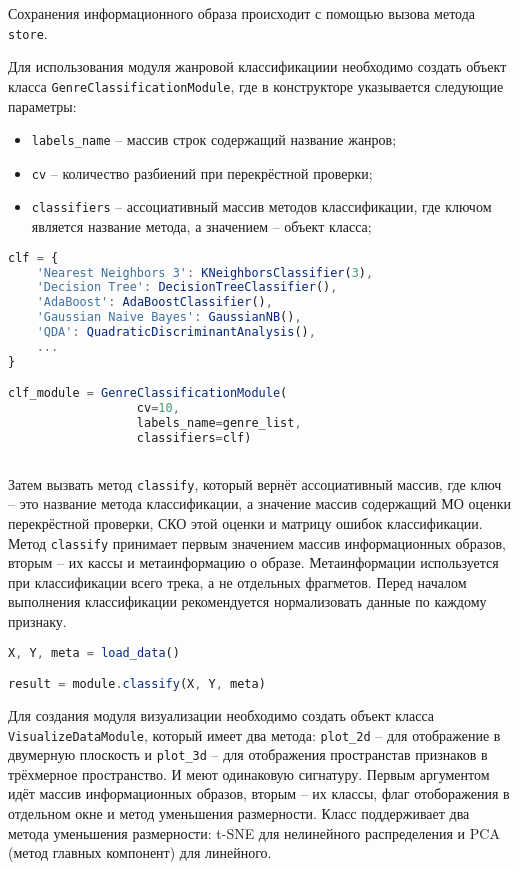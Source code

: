 Сохранения информационного образа  происходит с помощью вызова  метода \texttt{store}.


Для использования модуля жанровой классификациии необходимо создать объект класса \texttt{GenreClassificationModule}, где в конструкторе  указывается следующие параметры:

\begin{itemize} 
\item \texttt{labels\_name} -- массив строк содержащий название жанров;
\item \texttt{cv}  -- количество разбиений при перекрёстной проверки;
\item \texttt{classifiers}  -- ассоциативный массив методов классификации, где ключом является название метода, а значением  -- объект класса;
\end{itemize}

\begin{lstlisting}[language=TypeScript, label=lst:testing:results]
clf = {
    'Nearest Neighbors 3': KNeighborsClassifier(3),
    'Decision Tree': DecisionTreeClassifier(),
    'AdaBoost': AdaBoostClassifier(),
    'Gaussian Naive Bayes': GaussianNB(),
    'QDA': QuadraticDiscriminantAnalysis(),
    ...
}

clf_module = GenreClassificationModule(
                  cv=10, 
                  labels_name=genre_list, 
                  classifiers=clf)
				 
\end{lstlisting}

Затем вызвать метод \texttt{classify}, который вернёт ассоциативный массив, где ключ -- это название метода классификации, а значение массив содержащий МО оценки перекрёстной проверки, СКО этой оценки и матрицу ошибок классификации. Метод \texttt{classify} принимает первым значением массив информационных образов, вторым -- их кассы и метаинформацию о образе. Метаинформации используется при классификации всего трека, а не отдельных фрагметов. Перед началом выполнения классификации рекомендуется нормализовать данные по каждому признаку.

\begin{lstlisting}[language=TypeScript, label=lst:testing:results]
X, Y, meta = load_data()

result = module.classify(X, Y, meta)
\end{lstlisting}

Для создания модуля визуализации необходимо создать объект класса \texttt{VisualizeDataModule}, который имеет два метода: \texttt{plot\_2d} -- для отображение в двумерную плоскость и \texttt{plot\_3d} -- для отображения пространстав признаков в трёхмерное пространство. И меют одинаковую сигнатуру. Первым аргументом идёт массив информационных образов, вторым -- их классы, флаг отоборажения в отдельном окне и метод уменьшения размерности. Класс поддерживает два метода уменьшения размерности: t-SNE для нелинейного распределения и PCA (метод главных компонент) для линейного.

